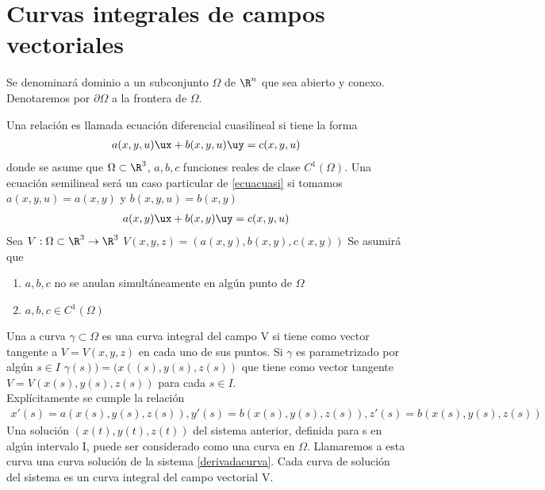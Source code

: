 \section{Curvas integrales de campos vectoriales}
\begin{Def}
    Se denominará dominio a un subconjunto $\Omega$ de $\R^n$ que sea abierto y conexo. Denotaremos por $\partial\Omega$ a la frontera de $\Omega$.
\end{Def}
Una relación es llamada ecuación diferencial cuasilineal si tiene la forma
\begin{eqnarray}
    \label{ecuacuasi}
    a(x,y,u)\ux+b(x,y,u)\uy=c(x,y,u)
\end{eqnarray}
donde se asume que $\Omega\subset\R^3$, $a,b,c$ funciones reales de clase $C^1(\Omega)$.
Una ecuación semilineal será un caso particular de \ref{ecuacuasi} si tomamos $a(x,y,u)=a(x,y)$ y $b(x,y,u)=b(x,y)$
\begin{eqnarray}
\label{ecuasemi} 
a(x,y)\ux+b(x,y)\uy=c(x,y,u) 
\end{eqnarray}
Sea $V:\Omega\subset\R^3\rightarrow\R^3$ $V(x,y,z)=(a(x,y),b(x,y),c(x,y))$
Se asumirá que 
\begin{enumerate}
    \item  $a,b,c$ no se anulan simultáneamente en algún punto de $\Omega$
    \item $a,b,c\in C^1(\Omega)$
\end{enumerate}
\begin{Def}
    Una a curva $\gamma\subset\Omega$ es una curva integral del campo V si tiene como vector tangente a $V=V(x,y,z)$ en cada uno de sus puntos. Si $\gamma$ es parametrizado por algún $s\in I$
    $\gamma(s))=(x((s),y(s),z(s))$ que tiene como vector tangente $V=V(x(s),y(s),z(s))$ para cada $s\in I$.\\
    Explícitamente se cumple la relación 
    \begin{eqnarray}
        x'(s)=a(x(s),y(s),z(s)) , y'(s)=b(x(s),y(s),z(s)) , z'(s)=b(x(s),y(s),z(s))\label{derivadacurva}
    \end{eqnarray}
    Una solución $(x (t), y (t), z (t))$ del sistema anterior, definida para s en algún intervalo I, puede ser considerado como una curva en $\Omega$. Llamaremos a esta curva una curva solución de la
    sistema \ref{derivadacurva}. Cada curva de solución del sistema es un
    curva integral del campo vectorial V.
\end{Def}